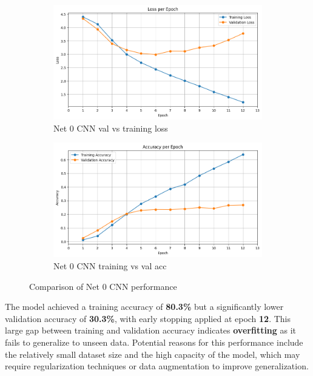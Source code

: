 \documentclass[12pt]{article}
\begin{document}
\begin{figure}[ht]
    \centering
    \begin{subfigure}{0.45\linewidth}
        \centering
        \includegraphics[width=\linewidth]{net0_loss.png}
        \caption{Net 0 CNN val vs training loss}
        \label{fig:net0_loss}
    \end{subfigure}
    \hfill
    \begin{subfigure}{0.45\linewidth}
        \centering
        \includegraphics[width=\linewidth]{net0_CNN_Acc.png}
        \caption{Net 0 CNN training vs val acc}
        \label{fig:net0_CNN_Acc}
    \end{subfigure}
    \caption{Comparison of Net 0 CNN performance}
    \label{fig:net0_CNN_performance}
\end{figure}

The model achieved a training accuracy of \textbf{80.3\%} but a significantly lower validation accuracy of \textbf{30.3\%}, with early stopping applied at epoch \textbf{12}. This large gap between training and validation accuracy indicates \textbf{overfitting} as it fails to generalize to unseen data. Potential reasons for this performance include the relatively small dataset size and the high capacity of the model, which may require regularization techniques or data augmentation to improve generalization.
\end{document}
